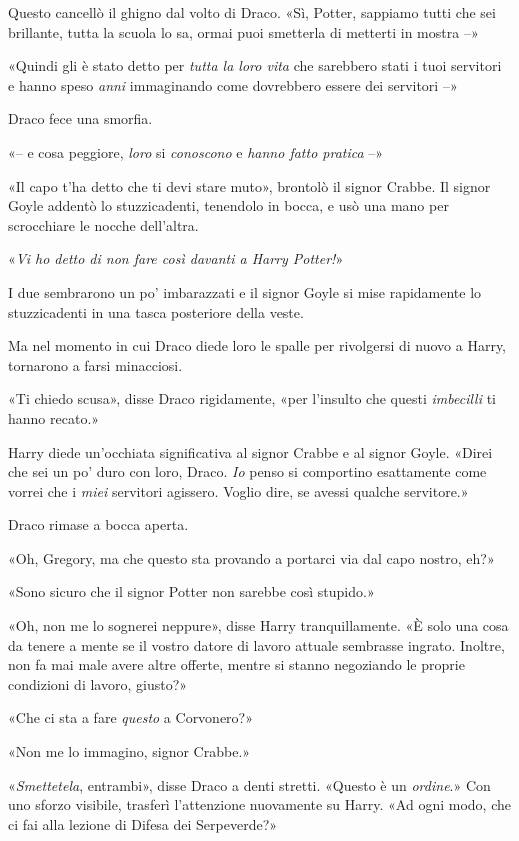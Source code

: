 Questo cancellò il ghigno dal volto di Draco. «Sì, Potter, sappiamo tutti che sei brillante, tutta la scuola lo sa, ormai puoi smetterla di metterti in mostra –»

«Quindi gli è stato detto per \textit{tutta la loro vita} che sarebbero stati i tuoi servitori e hanno speso \textit{anni} immaginando come dovrebbero essere dei servitori –»

Draco fece una smorfia.

«– e cosa peggiore, \textit{loro} si \textit{conoscono} e \textit{hanno fatto pratica} –»

«Il capo t’ha detto che ti devi stare muto», brontolò il signor Crabbe. Il signor Goyle addentò lo stuzzicadenti, tenendolo in bocca, e usò una mano per scrocchiare le nocche dell’altra.

«\textit{Vi ho detto di non fare così davanti a Harry Potter!}»

I due sembrarono un po’ imbarazzati e il signor Goyle si mise rapidamente lo stuzzicadenti in una tasca posteriore della veste.

Ma nel momento in cui Draco diede loro le spalle per rivolgersi di nuovo a Harry, tornarono a farsi minacciosi.

«Ti chiedo scusa», disse Draco rigidamente, «per l’insulto che questi \textit{imbecilli} ti hanno recato.»

Harry diede un’occhiata significativa al signor Crabbe e al signor Goyle. «Direi che sei un po’ duro con loro, Draco. \textit{Io} penso si comportino esattamente come vorrei che i \textit{miei} servitori agissero. Voglio dire, se avessi qualche servitore.»

Draco rimase a bocca aperta.

«Oh, Gregory, ma che questo sta provando a portarci via dal capo nostro, eh?»

«Sono sicuro che il signor Potter non sarebbe così stupido.»

«Oh, non me lo sognerei neppure», disse Harry tranquillamente. «È solo una cosa da tenere a mente se il vostro datore di lavoro attuale sembrasse ingrato. Inoltre, non fa mai male avere altre offerte, mentre si stanno negoziando le proprie condizioni di lavoro, giusto?»

«Che ci sta a fare \textit{questo} a Corvonero?»

«Non me lo immagino, signor Crabbe.»

«\textit{Smettetela}, entrambi», disse Draco a denti stretti. «Questo è un \textit{ordine}.» Con uno sforzo visibile, trasferì l’attenzione nuovamente su Harry. «Ad ogni modo, che ci fai alla lezione di Difesa dei Serpeverde?»

